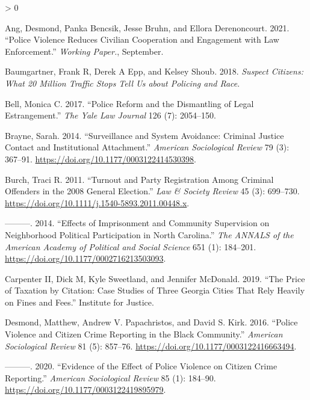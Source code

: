 \documentclass[
  12pt,
]{article}
\newlength{\cslhangindent}
\newenvironment{CSLReferences}[2] %
 {%
  \setlength{\parindent}{0pt}
  \ifodd #1 \everypar{\setlength{\hangindent}{\cslhangindent}}\ignorespaces\fi
  \ifnum #2 > 0
  \setlength{\parskip}{#2\baselineskip}
  \fi
 }%
 {}
\begin{document}
\hypertarget{refs}{}
\begin{CSLReferences}{1}{0}
\leavevmode\hypertarget{ref-Ang2021}{}%
Ang, Desmond, Panka Bencsik, Jesse Bruhn, and Ellora Derenoncourt. 2021. {``Police {Violence Reduces Civilian Cooperation} and {Engagement} with {Law Enforcement}.''} \emph{Working Paper.}, September.

\leavevmode\hypertarget{ref-Baumgartner2018}{}%
Baumgartner, Frank R, Derek A Epp, and Kelsey Shoub. 2018. \emph{Suspect Citizens: What 20 Million Traffic Stops Tell Us about Policing and Race}.

\leavevmode\hypertarget{ref-Bell2017}{}%
Bell, Monica C. 2017. {``Police {Reform} and the {Dismantling} of {Legal Estrangement}.''} \emph{The Yale Law Journal} 126 (7): 2054--150.

\leavevmode\hypertarget{ref-Brayne2014}{}%
Brayne, Sarah. 2014. {``Surveillance and {System Avoidance}: {Criminal Justice Contact} and {Institutional Attachment}.''} \emph{American Sociological Review} 79 (3): 367--91. \url{https://doi.org/10.1177/0003122414530398}.

\leavevmode\hypertarget{ref-Burch2011}{}%
Burch, Traci R. 2011. {``Turnout and {Party Registration} Among {Criminal Offenders} in the 2008 {General Election}.''} \emph{Law \& Society Review} 45 (3): 699--730. \url{https://doi.org/10.1111/j.1540-5893.2011.00448.x}.

\leavevmode\hypertarget{ref-Burch2014}{}%
---------. 2014. {``Effects of {Imprisonment} and {Community Supervision} on {Neighborhood Political Participation} in {North Carolina}.''} \emph{The ANNALS of the American Academy of Political and Social Science} 651 (1): 184--201. \url{https://doi.org/10.1177/0002716213503093}.

\leavevmode\hypertarget{ref-CarpenterII2019}{}%
Carpenter II, Dick M, Kyle Sweetland, and Jennifer McDonald. 2019. {``The {Price} of {Taxation} by {Citation}: {Case Studies} of {Three Georgia Cities That Rely Heavily} on {Fines} and {Fees}.''} {Institute for Justice}.

\leavevmode\hypertarget{ref-Desmond2016}{}%
Desmond, Matthew, Andrew V. Papachristos, and David S. Kirk. 2016. {``Police {Violence} and {Citizen Crime Reporting} in the {Black Community}.''} \emph{American Sociological Review} 81 (5): 857--76. \url{https://doi.org/10.1177/0003122416663494}.

\leavevmode\hypertarget{ref-Desmond2020}{}%
---------. 2020. {``Evidence of the {Effect} of {Police Violence} on {Citizen Crime Reporting}.''} \emph{American Sociological Review} 85 (1): 184--90. \url{https://doi.org/10.1177/0003122419895979}.


\end{CSLReferences}
\end{document}

